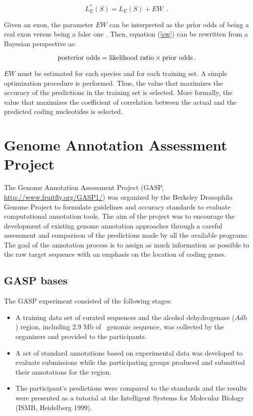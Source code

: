 \begin{equation}
\label{ew}
L_E^*(S) = L_E(S) + EW\,\,\,. 
\end{equation}

Given an exon, the parameter $EW$ can be interpreted as the prior odds
of being a real exon versus being a false one \citep{kass:1995a}. Then,
equation (\ref{ew}) can be rewritten from a Bayesian perspective
as:

\begin{equation}
\textnormal{posterior odds} = \textnormal{likelihood ratio} \times 
\textnormal{prior odds}\,. 
\end{equation}

$EW$ must be estimated for each species and for each training set. A
simple optimization procedure is performed. Thus, the value that
maximizes the accuracy of the predictions in the training set is
selected. More formally, the value that maximizes the coefficient of
correlation between the actual and the predicted coding nucleotides is
selected.


\section{Genome Annotation Assessment Project} 

The Genome Annotation Assessment Project (GASP,
\url{http://www.fruitfly.org/GASP1/}) was organized by the Berkeley 
Drosophila Genome Project to formulate guidelines and accuracy
standards to evaluate computational annotation tools. The aim of the
project was to encourage the development of existing genome annotation
approaches through a careful assessment and comparison of the
predictions made by all the available programs. The goal of the
annotation process is to assign as much information as possible to the
raw target sequence with an emphasis on the location of coding genes.

\subsection{GASP bases}

The GASP experiment consisted of the following stages:
\begin{itemize}
\item A training data set of curated sequences and the alcohol 
dehydrogenase ($Adh$) region, including 2.9 Mb of \DmL\ genomic
sequence, was collected by the organizers and provided to the
participants.
\item A set of standard annotations based on experimental data 
was developed to evaluate submissions while the participating groups
produced and submitted their annotations for the region.
\item The participant\'{ }s predictions were compared to the
standards and the results were presented as a tutorial at the
Intelligent Systems for Molecular Biology (ISMB, Heidelberg 1999).
\end{itemize}

